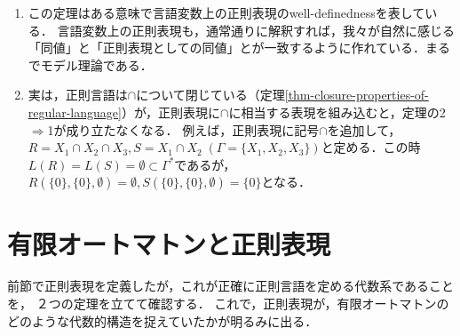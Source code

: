\documentclass[uplatex, dvipdfmx]{jsreport}
\begin{document}
\begin{remark}\label{remark-regular-expressions-on-language-variables}\mbox{}
    \begin{enumerate}
        \item この定理はある意味で言語変数上の正則表現のwell-definednessを表している．
        言語変数上の正則表現も，通常通りに解釈すれば，我々が自然に感じる「同値」と「正則表現としての同値」とが一致するように作れている．まるでモデル理論である．
        \item 実は，正則言語は$\cap$について閉じている（定理\ref{thm-closure-properties-of-regular-language}）が，正則表現に$\cap$に相当する表現を組み込むと，定理の2$\Rightarrow$1が成り立たなくなる．
        例えば，正則表現に記号$\cap$を追加して，$R=X_1\cap X_2\cap X_3,S=X_1\cap X_2\;(\Gamma=\{X_1,X_2,X_3\})$と定める．この時$L(R)=L(S)=\emptyset\subset\Gamma^*$であるが，$R(\{0\},\{0\},\emptyset)=\emptyset,S(\{0\},\{0\},\emptyset)=\{0\}$となる．
    \end{enumerate}
\end{remark}

\section{有限オートマトンと正則表現}

\begin{tcolorbox}[colframe=ForestGreen, colback=ForestGreen!10!white, breakable]
    前節で正則表現を定義したが，これが正確に正則言語を定める代数系であることを，
    ２つの定理を立てて確認する．
    これで，正則表現が，有限オートマトンのどのような代数的構造を捉えていたかが明るみに出る．
\end{tcolorbox}
\end{document}
